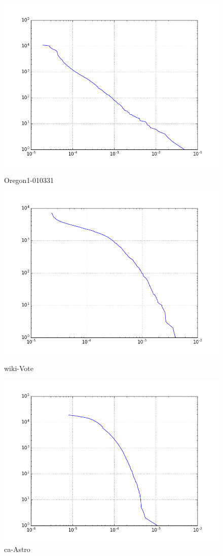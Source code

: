 \begin{figure}[H]
  \includegraphics[width=\linewidth]{img/oregon-010331/pagerank_ccdf.png}
  \caption*{Oregon1-010331}
\endminipage\hfill
{}
  \includegraphics[width=\linewidth]{img/wiki-Vote/pagerank_ccdf.png}
  \caption*{wiki-Vote}
\endminipage\hfill
{}
  \includegraphics[width=\linewidth]{img/ca-Astro/pagerank_ccdf.png}
  \caption*{ca-Astro}
\endminipage
\end{figure}
